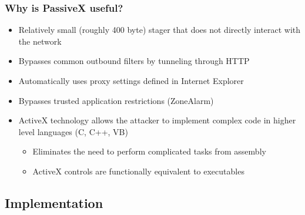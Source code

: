 \documentclass{beamer}
\newenvironment{sitemize}{\vspace{1mm}\begin{itemize}\itemsep 4pt\small}{\end{itemize}}
\begin{document}
\begin{frame}[t]
    \frametitle{Why is PassiveX useful?}

    \begin{sitemize}
        \item Relatively small (roughly 400 byte) stager that does not
        directly interact with the network

        \pause
        \item Bypasses common outbound filters by tunneling through
        HTTP

        \pause
        \item Automatically uses proxy settings defined in Internet
        Explorer

        \pause
        \item Bypasses trusted application restrictions (ZoneAlarm)

        \pause
        \item ActiveX technology allows the attacker to implement
        complex code in higher level languages (C, C++, VB)
        \begin{sitemize}
            \item Eliminates the need to perform complicated tasks
            from assembly
            \item ActiveX controls are functionally equivalent to
            executables
        \end{sitemize}
    \end{sitemize}
\end{frame}

\subsection{Implementation}
\end{document}
